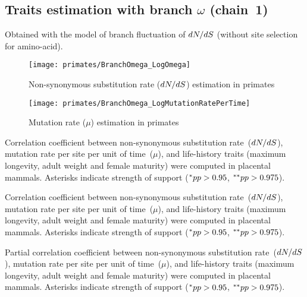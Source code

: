 \subsection{Traits estimation with branch \texorpdfstring{$\omega$}{ω} (chain~1)}
Obtained with the model of branch fluctuation of $\dnds$ (without site selection for amino-acid).

\begin{figure}[H]
    \centering
    \texttt{[image: primates/BranchOmega\_LogOmega]}
    \caption[$\dnds$ estimation in primates]{{Non-synonymous substitution} rate ($\dnds$) estimation in primates}
\end{figure}

\begin{figure}[H]
    \centering
    \texttt{[image: primates/BranchOmega\_LogMutationRatePerTime]}
    \caption[$\mu$ estimation in primates]{Mutation rate ($\mu$) estimation in primates}
\end{figure}

\begin{table}[H]
    
    \caption[Correlation coefficient matrix in primates ($\dnds$)]{
    Correlation coefficient between non-synonymous substitution rate~($\dnds$), mutation rate per site per unit of time~($\mu$), and life-history traits (maximum longevity, adult weight and female maturity) were computed in placental mammals.
    Asterisks indicate strength of support ($\smash{^{*}} pp > 0.95$, $\smash{^{**}} pp > 0.975$).}
\end{table}

\begin{table}[H]
    
    \caption[Covariance matrix in primates ($\dnds$)]{
    Correlation coefficient between non-synonymous substitution rate~($\dnds$), mutation rate per site per unit of time~($\mu$), and life-history traits (maximum longevity, adult weight and female maturity) were computed in placental mammals.
    Asterisks indicate strength of support ($\smash{^{*}} pp > 0.95$, $\smash{^{**}} pp > 0.975$).}
\end{table}

\begin{table}[H]
    
    \caption[Partial correlation coefficient matrix in primates ($\dnds$)]{
    Partial correlation coefficient between non-synonymous substitution rate~($\dnds$), mutation rate per site per unit of time~($\mu$), and life-history traits (maximum longevity, adult weight and female maturity) were computed in placental mammals.
    Asterisks indicate strength of support ($\smash{^{*}} pp > 0.95$, $\smash{^{**}} pp > 0.975$).}
\end{table}


